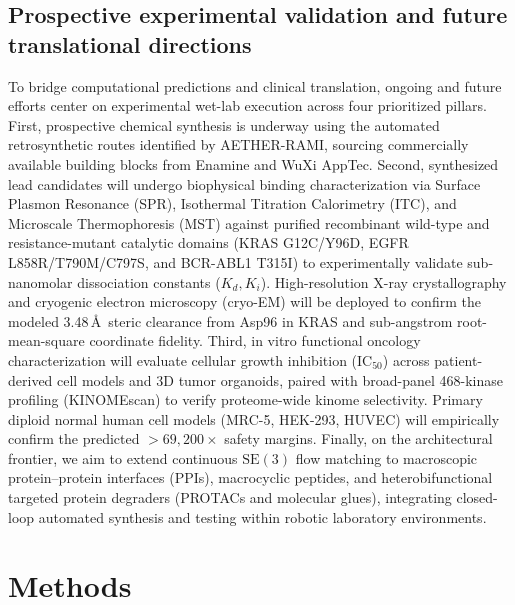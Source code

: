 \documentclass[11pt,a4paper]{article}
\begin{document}
\subsection*{Prospective experimental validation and future translational directions}
To bridge computational predictions and clinical translation, ongoing and future efforts center on experimental wet-lab execution across four prioritized pillars. First, prospective chemical synthesis is underway using the automated retrosynthetic routes identified by AETHER-RAMI, sourcing commercially available building blocks from Enamine and WuXi AppTec. Second, synthesized lead candidates will undergo biophysical binding characterization via Surface Plasmon Resonance (SPR), Isothermal Titration Calorimetry (ITC), and Microscale Thermophoresis (MST) against purified recombinant wild-type and resistance-mutant catalytic domains (KRAS G12C/Y96D, EGFR L858R/T790M/C797S, and BCR-ABL1 T315I) to experimentally validate sub-nanomolar dissociation constants ($K_d, K_i$). High-resolution X-ray crystallography and cryogenic electron microscopy (cryo-EM) will be deployed to confirm the modeled 3.48\,\AA\ steric clearance from Asp96 in KRAS and sub-angstrom root-mean-square coordinate fidelity. Third, in vitro functional oncology characterization will evaluate cellular growth inhibition ($\text{IC}_{50}$) across patient-derived cell models and 3D tumor organoids, paired with broad-panel 468-kinase profiling (KINOMEscan) to verify proteome-wide kinome selectivity. Primary diploid normal human cell models (MRC-5, HEK-293, HUVEC) will empirically confirm the predicted $>69,200\times$ safety margins. Finally, on the architectural frontier, we aim to extend continuous $\mathrm{SE}(3)$ flow matching to macroscopic protein--protein interfaces (PPIs), macrocyclic peptides, and heterobifunctional targeted protein degraders (PROTACs and molecular glues), integrating closed-loop automated synthesis and testing within robotic laboratory environments.



\section*{Methods}

\end{document}
